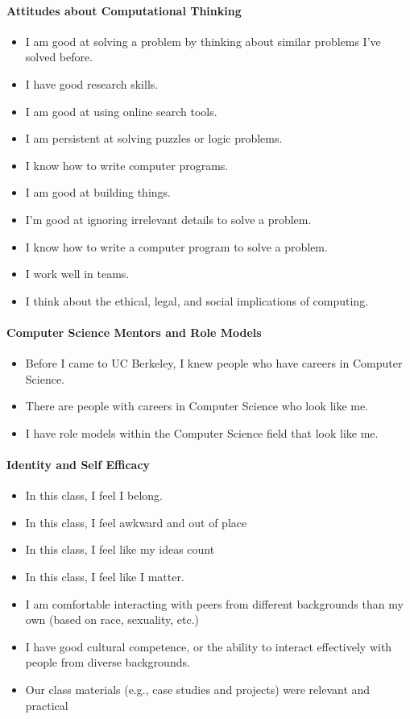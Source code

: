 \paragraph *{Attitudes about Computational Thinking}\mbox{}
\begin{itemize}
\item I am good at solving a problem by thinking about similar problems I've solved before.
\item I have good research skills.
\item I am good at using online search tools.
\item I am persistent at solving puzzles or logic problems.
\item I know how to write computer programs.
\item I am good at building things.
\item I'm good at ignoring irrelevant details to solve a problem.
\item I know how to write a computer program to solve a problem.
\item I work well in teams.
\item I think about the ethical, legal, and social implications of computing.
\end{itemize}

\paragraph *{Computer Science Mentors and Role Models}\mbox{}
\begin{itemize}
\item Before I came to UC Berkeley, I knew people who have careers in Computer Science.
\item There are people with careers in Computer Science who look like me.
\item I have role models within the Computer Science field that look like me.
\end{itemize}

\paragraph *{Identity and Self Efficacy}\mbox{}
\begin{itemize}
\item In this class, I feel I belong.
\item In this class, I feel awkward and out of place 
\item In this class, I feel like my ideas count
\item In this class, I feel like I matter.
\item I am comfortable interacting with peers from different backgrounds than my own (based on race, sexuality, etc.)
\item  I have good cultural competence, or the ability to interact effectively with people from diverse backgrounds.
\item Our class materials (e.g., case studies and projects) were relevant and practical
\end{itemize}

